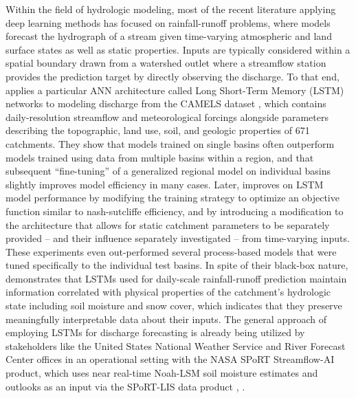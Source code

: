 Within the field of hydrologic modeling, most of the recent literature applying deep learning methods has focused on rainfall-runoff problems, where models forecast the hydrograph of a stream given time-varying atmospheric and land surface states as well as static properties. Inputs are typically considered within a spatial boundary drawn from a watershed outlet where a streamflow station provides the prediction target by directly observing the discharge. To that end, \citep{kratzert_rainfallrunoff_2018} applies a particular ANN architecture called Long Short-Term Memory (LSTM) networks to modeling discharge from the CAMELS dataset \citep{addor_camels_2017}, which contains daily-resolution streamflow and meteorological forcings alongside parameters describing the topographic, land use, soil, and geologic properties of 671 catchments. They show that models trained on single basins often outperform models trained using data from multiple basins within a region, and that subsequent ``fine-tuning'' of a generalized regional model on individual basins slightly improves model efficiency in many cases. Later, \citep{kratzert_towards_2019} improves on LSTM model performance by modifying the training strategy to optimize an objective function similar to nash-sutcliffe efficiency, and by introducing a modification to the architecture that allows for static catchment parameters to be separately provided -- and their influence separately investigated -- from time-varying inputs. These experiments even out-performed several process-based models that were tuned specifically to the individual test basins. In spite of their black-box nature, \citep{lees_hydrological_2022} demonstrates that LSTMs used for daily-scale rainfall-runoff prediction maintain information correlated with physical properties of the catchment's hydrologic state including soil moisture and snow cover, which indicates that they preserve meaningfully interpretable data about their inputs. The general approach of employing LSTMs for discharge forecasting is already being utilized by stakeholders like the United States National Weather Service and River Forecast Center offices in an operational setting with the NASA SPoRT Streamflow-AI product, which uses near real-time Noah-LSM soil moisture estimates and outlooks as an input via the SPoRT-LIS data product \citep{white_nasa_2025}, \citep{case_nasa_2022}.

